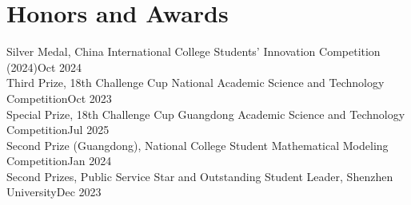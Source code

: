 \documentclass[a4paper,10pt]{article}
\begin{document}
\section{Honors and Awards}
Silver Medal, China International College Students' Innovation Competition (2024)\hfill Oct 2024\\
Third Prize, 18th Challenge Cup National Academic Science and Technology Competition\hfill Oct 2023\\
Special Prize, 18th Challenge Cup Guangdong Academic Science and Technology Competition\hfill Jul 2025\\
Second Prize (Guangdong), National College Student Mathematical Modeling Competition\hfill Jan 2024\\
Second Prizes, Public Service Star and Outstanding Student Leader, Shenzhen University\hfill Dec 2023
\end{document}
